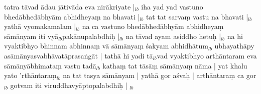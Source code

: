 \documentclass[article,12pt,a4paper]{memoir}%
\newcounter{parCount}
\begin{document}
	  
	  \pstart \leavevmode%
	tatra tāvad ādau jātivāda eva nirākriyate |{\tiny $_{lb}$} iha yad yad vastuno bhedābhedābhyām abhidheyaṃ na bhavati |{\tiny $_{lb}$} tat tat sarvaṃ vastu na bhavati |{\tiny $_{lb}$} yathā vyomakamalam |{\tiny $_{lb}$} na ca vastuno bhedābhedābhyām abhidheyaṃ sāmānyam iti vyā{\tiny $_{lb}$}pakānupalabdhiḥ |{\tiny $_{lb}$} na tāvad ayam asiddho hetuḥ |{\tiny $_{lb}$} na hi vyaktibhyo bhinnam abhinnaṃ vā sāmānyaṃ śakyam abhidhātum{\tiny $_{lb}$} ubhayathāpy asāmānyasvabhāvatāprasaṅgāt | tathā hi yadi tā{\tiny $_{lb}$}vad vyaktibhyo arthāntaram eva sāmānyābhimataṃ vastu tadā{\tiny $_{lb}$} kathaṃ tat tāsāṃ sāmānyaṃ nāma | yat khalu yato 'rthāntaraṃ{\tiny $_{lb}$} na tat tasya sāmānyam | yathā gor aśvaḥ | arthāntaraṃ ca gor{\tiny $_{lb}$} gotvam iti viruddhavyāptopalabdhiḥ |
	{}
	\pend%
      {\tiny $_{lb}$}
\end{document}
